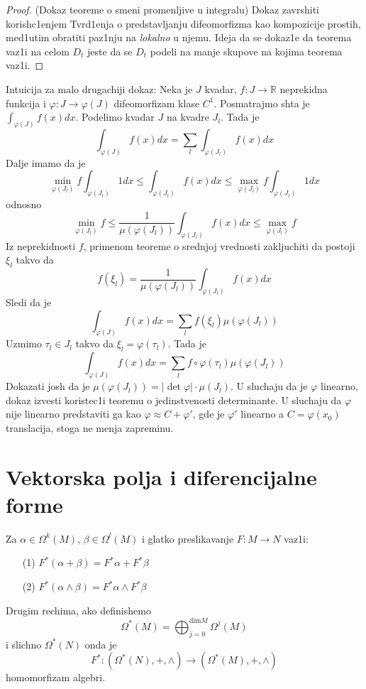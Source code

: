 \documentclass[a4paper,12pt]{article}
\newcommand{\RR}{\mathbb{R}}
\renewcommand{\dim}{\mathrm{dim}}
\begin{document}
\begin{proof}(Dokaz teoreme o smeni promenljive u integralu)
Dokaz zavrshiti korish\-c1enjem Tvrd1enja o predstavljanju difeomorfizma kao kompozicije prostih, med1utim obratiti paz1nju na \textit{lokalno} u njemu. Ideja da se dokaz1e da teorema vaz1i na celom $D_t$ jeste da se $D_t$ podeli na manje skupove na kojima teorema vaz1i.
\end{proof}

\begin{nap}
Intuicija za malo drugachiji dokaz:
Neka je $J$ kvadar, $f: J \to \RR$ neprekidna funkcija i $\varphi: J \to \varphi(J)$ difeomorfizam klase $C^1$. Posmatrajmo shta je $\int_{\varphi(J)} f(x) dx$. Podelimo kvadar $J$ na kvadre $J_l$. Tada je \[\int_{\varphi(J)} f(x) dx = \sum_l \int_{\varphi(J_l)} f(x) dx\]
Dalje imamo da je
\[\min_{\varphi(J_l)} f \int_{\varphi(J_l)} 1 dx \leq \int_{\varphi(J_l)} f(x) dx \leq \max_{\varphi(J_l)} f \int_{\varphi(J_l)} 1 dx\]
odnosno
\[\min_{\varphi(J_l)} f \leq \frac{1}{\mu(\varphi(J_l))}\int_{\varphi(J_l)} f(x) dx \leq \max_{\varphi(J_l)} f \]
Iz neprekidnosti $f$, primenom teoreme o srednjoj vrednosti zakljuchiti da postoji $\xi_l$ takvo da
\[f(\xi_l) =\frac{1}{\mu(\varphi(J_l))}\int_{\varphi(J_l)} f(x) dx\]
Sledi da je \[\int_{\varphi(J)} f(x) dx = \sum_l f(\xi_l) \mu(\varphi(J_l))\]
 Uzmimo $\tau_l \in J_l$ takvo da $\xi_l = \varphi(\tau_l)$. Tada je
\[\int_{\varphi(J)} f(x) dx = \sum_l f \circ \varphi(\tau_l) \mu(\varphi(J_l))\]
Dokazati josh da je $\mu(\varphi(J_l)) = |\det \varphi| \cdot \mu(J_l)$. U sluchaju da je $\varphi$ linearno, dokaz izvesti koristec1i teoremu o jedinstvenosti determinante. U sluchaju da $\varphi$ nije linearno predstaviti ga kao $\varphi \approx C + \varphi '$, gde je $\varphi '$ linearno a $C = \varphi(x_0)$ translacija, stoga ne menja zapreminu.
\end{nap}

\section{Vektorska polja i diferencijalne forme}

\begin{tvr}
Za $\alpha \in \Omega^k(M)$, $\beta \in \Omega^l(M)$ i glatko preslikavanje $F: M \to N$ vaz1i:
\begin{itemize}
\item[(1)] $F^* (\alpha + \beta) = F^* \alpha + F^* \beta$
\item[(2)] $F^* (\alpha \wedge \beta) = F^* \alpha \wedge F^* \beta$
\end{itemize}
Drugim rechima, ako definishemo \[\Omega^*(M) = \bigoplus^{\dim M}_{j=0} \Omega^j (M)\] i slichno $\Omega^*(N) $ onda je 
\[F^*: (\Omega^*(N), +, \wedge) \to (\Omega^*(M), +, \wedge)\]
homomorfizam algebri.
\end{tvr}
\end{document}
